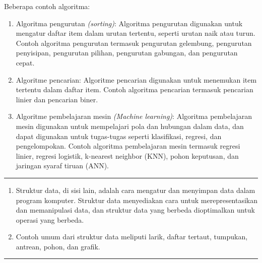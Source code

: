 \documentclass[12pt,preprintnumbers,amsmath,amssymb,nofootinbib,superscriptaddress]{revtex4-1}
\begin{document}
\vspace{2cm}
Beberapa contoh algoritma:
\begin{enumerate}
    \item Algoritma pengurutan \textit{(sorting)}: Algoritma pengurutan digunakan untuk mengatur daftar item dalam urutan tertentu, seperti urutan naik atau turun. Contoh algoritma pengurutan termasuk pengurutan gelembung, pengurutan penyisipan, pengurutan pilihan, pengurutan gabungan, dan pengurutan cepat.
    \item Algoritme pencarian: Algoritme pencarian digunakan untuk menemukan item tertentu dalam daftar item. Contoh algoritma pencarian termasuk pencarian linier dan pencarian biner.
    \item Algoritme pembelajaran mesin \textit{(Machine learning)}: Algoritma pembelajaran mesin digunakan untuk mempelajari pola dan hubungan dalam data, dan dapat digunakan untuk tugas-tugas seperti klasifikasi, regresi, dan pengelompokan. Contoh algoritma pembelajaran mesin termasuk regresi linier, regresi logistik, k-nearest neighbor (KNN), pohon keputusan, dan jaringan syaraf tiruan (ANN).
\end{enumerate}

\vspace{1cm}

\newpage

\label{Ueff}
\vspace{-0.7cm}
\vspace{-0.2cm}\hrule

\vspace{2cm}

\begin{enumerate}
    \item Struktur data, di sisi lain, adalah cara mengatur dan menyimpan data dalam program komputer. Struktur data menyediakan cara untuk merepresentasikan dan memanipulasi data, dan struktur data yang berbeda dioptimalkan untuk operasi yang berbeda. 
    \item Contoh umum dari struktur data meliputi larik, daftar tertaut, tumpukan, antrean, pohon, dan grafik.
\end{enumerate}

\vspace{1cm}

\newpage

\label{Ueff}
\vspace{-0.7cm}
\vspace{-0.2cm}\hrule
\end{document}
